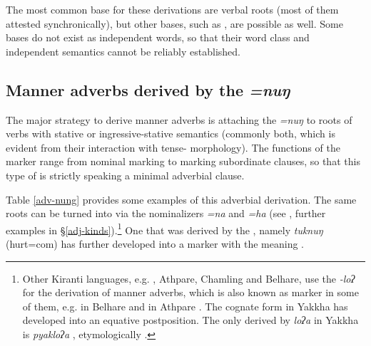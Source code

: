 The most common base for these derivations are verbal roots (most of them attested synchronically), but other bases, such  as , are possible as well. Some bases do not exist as independent words, so  that their word class and independent semantics cannot be reliably established. 

\subsection{Manner adverbs derived by the  \emph{=nuŋ}}
 
The major strategy to derive manner adverbs is attaching the    \emph{=nuŋ} to roots of verbs with stative or ingressive-stative semantics (commonly both, which is evident from their interaction with tense- morphology). The functions of the  marker range from nominal  marking to marking subordinate clauses, so that this type of  is strictly speaking a minimal adverbial clause.

Table \ref{adv-nung} provides some examples of this adverbial derivation. The same roots can be turned  into  via the nominalizers \emph{=na} and \emph{=ha} (see \Next, further examples in §\ref{adj-kinds}).\footnote{Other Kiranti languages, e.g. , Athpare, Chamling and Belhare, use the  \emph{-loʔ} for the derivation of manner adverbs, which is also known as   marker in some of them, e.g. in Belhare \citep[549]{Bickel2003Belhare} and in Athpare \citep[81]{Ebert1994The-structure}. The cognate form in Yakkha has developed into an equative postposition. The only  derived by \emph{loʔa} in Yakkha is \emph{pyakloʔa} , etymologically .}  One  that was derived by the , namely \emph{tuknuŋ} (hurt={\sc com}) has further developed into a  marker with the meaning . 
 
